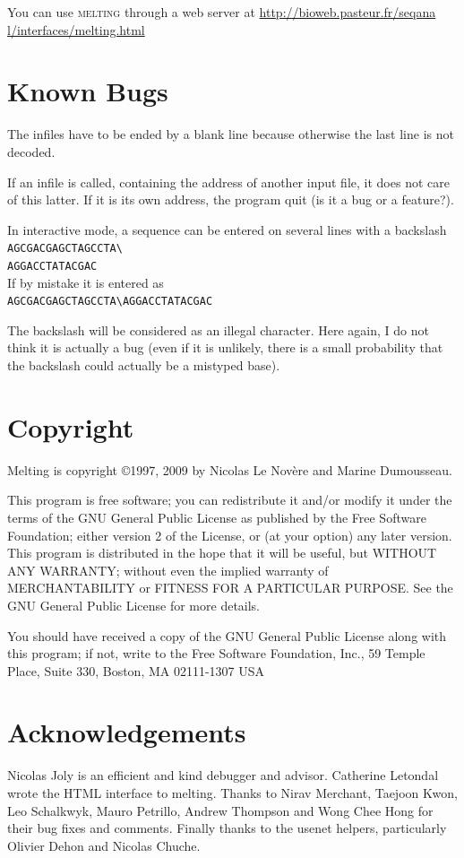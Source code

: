 \documentclass{article}
\begin{document}
You can use \textsc{melting} through a web server at \url{http://bioweb.pasteur.fr/seqana
l/interfaces/melting.html}
  
\section{Known Bugs }
The infiles have to be ended by a blank line because otherwise the last line is not decoded.

If an infile is called, containing the 
address of another input file, it does not care of this latter.  If it 
is its own address, the program quit (is it a bug or a feature?).   
 
In interactive mode, a sequence can be entered on several lines with a backslash\\
\texttt{AGCGACGAGCTAGCCTA{\textbackslash}\\
AGGACCTATACGAC}\\
If by mistake it is entered as  \\
\texttt{AGCGACGAGCTAGCCTA{\textbackslash}{}AGGACCTATACGAC}

The backslash will be considered 
 as an illegal character. Here again, I do not think it is actually a bug 
(even if it is unlikely, there is a small probability that the  backslash 
could actually be a mistyped base).   
   
\section{Copyright }
Melting is copyright 
\copyright 1997, 2009 by Nicolas Le Nov\`ere and Marine Dumousseau.  

This program is free software; 
you can redistribute it and/or modify it under the terms of the GNU General 
Public License as published by the Free Software Foundation; either version 
2 of the License, or (at your option) any later version.   
  This program 
is distributed in the hope that it will be useful, but WITHOUT ANY WARRANTY; 
without even the implied warranty of MERCHANTABILITY or FITNESS FOR A 
PARTICULAR PURPOSE.  See the GNU General Public License for more details. 
  
  You should have received a copy of the GNU General Public License 
along with this program; if not, write to the Free Software Foundation, 
Inc., 59 Temple Place, Suite 330, Boston, MA  02111-1307 USA   
   
\section{Acknowledgements}
Nicolas Joly is an efficient and kind debugger and advisor.  Catherine Letondal
wrote the HTML interface to melting. Thanks to Nirav Merchant, Taejoon Kwon, Leo
Schalkwyk, Mauro Petrillo, Andrew Thompson and Wong Chee Hong for their bug fixes and comments.
Finally thanks to the usenet helpers, particularly Olivier Dehon and Nicolas
Chuche.
   
\end{document}
